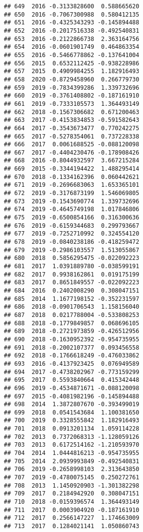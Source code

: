 \documentclass[
]{article}
\begin{document}
\begin{verbatim}
## 649  2016 -0.3133828600  0.588665620
## 650  2016 -0.7067300988  0.580412135
## 651  2016 -0.4325343293 -0.145894488
## 652  2016 -0.2017516338 -0.492540831
## 653  2016 -0.2122866738  2.363164756
## 654  2016 -0.0601901749  0.464863354
## 655  2016 -0.5466778862 -0.137641004
## 656  2015  0.6532112425 -0.938228986
## 657  2015  0.4909984255  1.182916493
## 658  2020 -0.8729458960  0.266779730
## 659  2019 -0.7834399286  1.339732696
## 660  2019 -0.3761408802 -0.187161910
## 661  2019 -0.7333105573  1.364493149
## 662  2018 -0.1567306682  0.671200463
## 663  2017 -0.4153834853 -0.591582643
## 664  2017 -0.3543673477  0.770242275
## 665  2017 -0.5278354061  0.737228338
## 666  2017  0.0061688525 -0.088120098
## 667  2017 -0.4404230476 -0.178908426
## 668  2016 -0.8044932597  3.667215284
## 669  2015 -0.3344194422  1.488295414
## 670  2018 -0.1334162396  0.060442621
## 671  2019 -0.2696683063  1.653365101
## 672  2019 -0.3176873199  1.546069805
## 673  2019 -0.1543690774  1.339732696
## 674  2019 -0.4645749198  1.017846806
## 675  2019 -0.6500854166  0.316300636
## 676  2019 -0.6159344683  0.299793667
## 677  2019 -0.7252710992  0.324554120
## 678  2019 -0.0840238186 -0.418259472
## 679  2019 -0.2986103557  1.513055867
## 680  2018  0.5856295475 -0.022092223
## 681  2017  1.0391889780 -0.038599191
## 682  2017  0.9938162861  0.019175199
## 683  2017  0.8651849557 -0.022092223
## 684  2016  0.2402008290  0.308047151
## 685  2014  1.1677198152 -0.352231597
## 686  2018 -0.0901706543  1.158156040
## 687  2018  0.0217788004 -0.533808253
## 688  2018 -0.1779849857  0.068696105
## 689  2018 -0.2721973859 -0.426512956
## 690  2018 -0.1630952392 -0.954735955
## 691  2018 -0.2002107377  0.093456558
## 692  2018 -0.1766618249 -0.476033862
## 693  2016 -0.4137923425  0.076949589
## 694  2017 -0.4738202967 -0.773159299
## 695  2017  0.5593840664  0.415342448
## 696  2019 -0.4534871671 -0.088120098
## 697  2015 -0.4081982196 -0.145894488
## 698  2014  1.3872807670 -0.393499019
## 699  2018  0.0541543684  1.100381650
## 700  2019  0.3328555842  1.182916493
## 701  2018  0.0913201134  1.059114228
## 702  2013  0.7372068313 -1.128059126
## 703  2013  0.6172514162 -1.210593970
## 704  2014  1.0444816213 -0.954735955
## 705  2014  2.0939993849 -0.492540831
## 706  2019 -0.2658998103  2.313643850
## 707  2019 -0.4780075145  0.250272761
## 708  2013  1.1450920903 -1.301382298
## 709  2017  0.2184942920  0.308047151
## 710  2018 -0.0159396574  1.364493149
## 711  2017  0.0003904920 -0.187161910
## 712  2017  0.2566147227  1.174663009
## 713  2017  0.1284021141  1.050860743

\end{verbatim}
\end{document}

